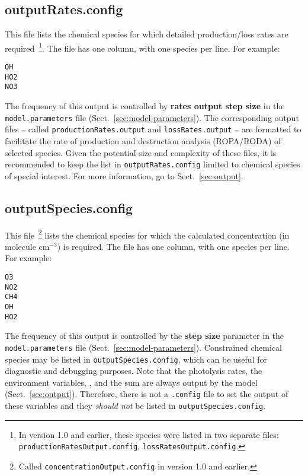 \subsection{outputRates.config} \label{subsec:outputrates}

This file lists the chemical species for which detailed
production/loss rates are required~\footnote{In version 1.0 and
  earlier, these species were listed in two separate files:
  \texttt{productionRatesOutput.config}, \texttt{lossRatesOutput.config}.}.
The file has one column, with one species per line. For example:

\begin{verbatim}
OH
HO2
NO3
\end{verbatim}

The frequency of this output is controlled by \textbf{rates output step size}
in the \texttt{model.parameters} file (Sect.~\ref{sec:model-parameters}).
The corresponding output files -- called \texttt{productionRates.output}
and \texttt{lossRates.output} -- are formatted to facilitate the rate
of production and destruction analysis (ROPA/RODA) of selected species.
Given the potential size and complexity of these files, it is
recommended to keep the list in \texttt{outputRates.config} limited
to chemical species of special interest. For more information, go to
Sect.~\ref{sec:output}.

\subsection{outputSpecies.config} \label{subsec:outputspecies}

This file~\footnote{Called \texttt{concentrationOutput.config} in
  version 1.0 and earlier.} lists the chemical species for which the
calculated concentration (in molecule cm$^{-3}$) is required. The file
has one column, with one species per line. For example:

\begin{verbatim}
O3
NO2
CH4
OH
HO2
\end{verbatim}

The frequency of this output is controlled by the \textbf{step size} parameter
in the \texttt{model.parameters} file (Sect.~\ref{sec:model-parameters}).
Constrained chemical species may be listed in \texttt{outputSpecies.config},
which can be useful for diagnostic and debugging purposes. Note that
the photolysis rates, the environment variables, , and the
 sum are always output by the model (Sect.~\ref{sec:output}).
Therefore, there is not a \texttt{.config} file to set the output of
these variables and they \emph{should not} be listed in
\texttt{outputSpecies.config}.

